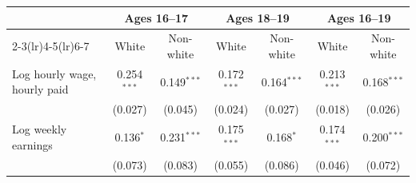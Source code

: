 \begin{tabular}{lcccccc}
\toprule
 & \multicolumn{2}{c}{Ages 16--17} & \multicolumn{2}{c}{Ages 18--19} & \multicolumn{2}{c}{Ages 16--19} \\
\cmidrule(lr){2-3}\cmidrule(lr){4-5}\cmidrule(lr){6-7}
 & White & Non-white & White & Non-white & White & Non-white \\
\midrule
Log hourly wage, hourly paid & 0.254$^{***}$ & 0.149$^{***}$ & 0.172$^{***}$ & 0.164$^{***}$ & 0.213$^{***}$ & 0.168$^{***}$ \\
 & (0.027) & (0.045) & (0.024) & (0.027) & (0.018) & (0.026) \\
Log weekly earnings & 0.136$^{*}$ & 0.231$^{***}$ & 0.175$^{***}$ & 0.168$^{*}$ & 0.174$^{***}$ & 0.200$^{***}$ \\
 & (0.073) & (0.083) & (0.055) & (0.086) & (0.046) & (0.072) \\
\bottomrule
\end{tabular}
